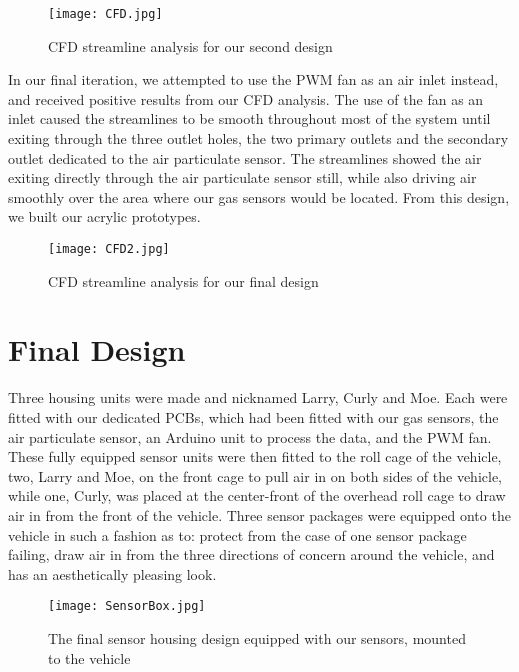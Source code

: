 \begin{figure}[H]
	\centering
	\texttt{[image: CFD.jpg]}
	\caption{CFD streamline analysis for our second design}
	\label{fig:CFD2}
\end{figure}

In our final iteration, we attempted to use the PWM fan as an air inlet instead, and received positive results from our CFD analysis. The use of the fan as an inlet caused the streamlines to be smooth throughout most of the system until exiting through the three outlet holes, the two primary outlets and the secondary outlet dedicated to the air particulate sensor. The streamlines showed the air exiting directly through the air particulate sensor still, while also driving air smoothly over the area where our gas sensors would be located. From this design, we built our acrylic prototypes. 

\begin{figure}[H]
	\centering
	\texttt{[image: CFD2.jpg]}
	\caption{CFD streamline analysis for our final design}
	\label{fig:CFD}
\end{figure}

\section{Final Design}
Three housing units were made and nicknamed Larry, Curly and Moe. Each were fitted with our dedicated PCBs, which had been fitted with our gas sensors, the air particulate sensor, an Arduino unit to process the data, and the PWM fan. These fully equipped sensor units were then fitted to the roll cage of the vehicle, two, Larry and Moe, on the front cage to pull air in on both sides of the vehicle, while one, Curly, was placed at the center-front of the overhead roll cage to draw air in from the front of the vehicle. Three sensor packages were equipped onto the vehicle in such a fashion as to: protect from the case of one sensor package failing, draw air in from the three directions of concern around the vehicle, and has an aesthetically pleasing look.

\begin{figure}[H]
	\centering
	\texttt{[image: SensorBox.jpg]}
	\caption{The final sensor housing design equipped with our sensors, mounted to the vehicle}
	\label{fig:Box}
\end{figure}
